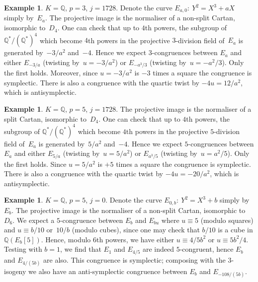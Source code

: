 \documentclass[12pt, reqno]{amsart}
\newcommand{\Q}{\mathbb{Q}}
\newcommand{\Z}{\mathbb{Z}}
\numberwithin{equation}{section}
\theoremstyle{definition}
\newtheorem{example}[theorem]{Example}
\theoremstyle{remark}
\begin{document}
\begin{example}\label{Ex:j1728p3}
$K=\Q$, $p=3$, $j=1728$.  Denote the curve $E_{a,0}:\ Y^2=X^3+aX$
  simply by~$E_a$.  The projective image is the normaliser of a
  non-split Cartan, isomorphic to~$D_4$.  One can check that up to
  $4$th powers, the subgroup of $\Q^*/(\Q^*)^4$ which become $4$th
  powers in the projective $3$-division field of~$E_a$ is generated
  by~$-3/a^2$ and~$-4$.  Hence we expect $3$-congruences between $E_a$
  and either $E_{-3/a}$ (twisting by~$u=-3/a^2$) or $E_{-a^3/3}$
  (twisting by~$u=-a^2/3$).  Only the first holds.  Moreover, since
  $u=-3/a^2$ is $-3$ times a square the congruence is symplectic.
  There is also a congruence with the quartic twist by $-4u=12/a^2$,
  which is antisymplectic.
\end{example}

\begin{example}\label{Ex:j1728p5}
$K=\Q$, $p=5$, $j=1728$.  The projective image is the normaliser of a
  split Cartan, isomorphic to~$D_4$.  One can check that up to $4$th
  powers, the subgroup of $\Q^*/(\Q^*)^4$ which become $4$th powers in
  the projective $5$-division field of~$E_a$ is generated by~$5/a^2$
  and~$-4$.  Hence we expect $5$-congruences between $E_a$ and either
  $E_{5/a}$ (twisting by~$u=5/a^2$) or $E_{a^3/5}$ (twisting
  by~$u=a^2/5$).  Only the first holds.  Since
  $u=5/a^2$ is $+5$ times a square the congruence is symplectic.
  There is also a congruence with the quartic twist by $-4u=-20/a^2$,
  which is antisymplectic.
\end{example}

\begin{example}\label{Ex:j0p5}
$K=\Q$, $p=5$, $j=0$.  Denote the curve $E_{0,b}:\ Y^2=X^3+b$
  simply by~$E_b$. The projective image is the normaliser of a
  non-split Cartan, isomorphic to~$D_6$.  We expect a
  $5$-congruence between $E_b$ and $E_{bu}$ where $u\equiv5$ (modulo
  squares) and $u\equiv b/10$ or~$10/b$ (modulo cubes), since one may
  check that $b/10$ is a cube in $\Q(E_b[5])$.  Hence, modulo $6$th
  powers, we have either $u\equiv 4/5b^2$ or $u\equiv 5b^2/4$.
  Testing with $b=1$, we find that $E_1$ and $E_{4/5}$ are indeed
  $5$-congruent, hence $E_b$ and $E_{4/(5b)}$ are also.  This
  congruence is symplectic; composing with the $3$-isogeny we also
  have an anti-symplectic congruence between $E_b$ and
  $E_{-108/(5b)}$.
\end{example}
\end{document}
